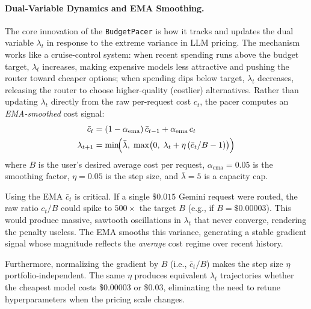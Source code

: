 \paragraph{Dual-Variable Dynamics and EMA Smoothing.}
The core innovation of the \texttt{BudgetPacer} is how it tracks and updates the dual variable $\lambda_t$ in response to the extreme variance in LLM pricing.  The mechanism works like a cruise-control system: when recent spending runs above the budget target, $\lambda_t$ increases, making expensive models less attractive and pushing the router toward cheaper options; when spending dips below target, $\lambda_t$ decreases, releasing the router to choose higher-quality (costlier) alternatives.  Rather than updating $\lambda_t$ directly from the raw per-request cost $c_t$, the pacer computes an \emph{EMA-smoothed} cost signal:
\begin{align}
    \bar{c}_t &= (1 - \alpha_{\mathrm{ema}})\,\bar{c}_{t-1}
                 + \alpha_{\mathrm{ema}}\,c_t
    \label{eq:cost_ema} \\
    \lambda_{t+1} &= \min\!\Bigl(\bar\lambda,\;
    \max\bigl(0,\;\lambda_t + \eta\,(\bar{c}_t / B - 1)\bigr)\Bigr)
    \label{eq:dual_update}
\end{align}
where $B$ is the user's desired average cost per request, $\alpha_{\mathrm{ema}}=0.05$ is the smoothing factor, $\eta=0.05$ is the step size, and $\bar\lambda=5$ is a capacity cap.

Using the EMA $\bar{c}_t$ is critical. If a single $\$0.015$ Gemini request were routed, the raw ratio $c_t/B$ could spike to $500\times$ the target $B$ (e.g., if $B=\$0.00003$). This would produce massive, sawtooth oscillations in $\lambda_t$ that never converge, rendering the penalty useless. The EMA smooths this variance, generating a stable gradient signal whose magnitude reflects the \emph{average} cost regime over recent history. 

Furthermore, normalizing the gradient by $B$ (i.e., $\bar{c}_t / B$) makes the step size $\eta$ portfolio-independent. The same $\eta$ produces equivalent $\lambda_t$ trajectories whether the cheapest model costs \$0.00003 or \$0.03, eliminating the need to retune hyperparameters when the pricing scale changes.

